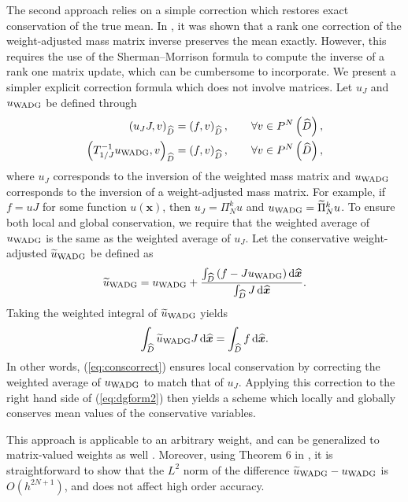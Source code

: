 \documentclass[preprint,10pt]{article}
\theoremstyle{definition}
\theoremstyle{lemma}
\theoremstyle{theorem}
\theoremstyle{assumption}
\renewcommand{\hat}{\widehat}
\renewcommand{\tilde}{\widetilde}
\newcommand{\LRp}[1]{\left( #1 \right)}
\newcommand*\diff[1]{\mathop{}\!{\mathrm{d}#1}} %
\begin{document}
{The second approach relies on a simple correction which restores exact conservation of the true mean.  In \cite{chan2016weight2}, it was shown that a rank one correction of the weight-adjusted mass matrix inverse preserves the mean exactly.  However, this requires the use of the Sherman--Morrison formula to compute the inverse of a rank one matrix update, which can be cumbersome to incorporate.  We present a simpler explicit correction formula which does not involve matrices.  Let $u_J$ and $u_{\rm WADG}$ be defined through 
\begin{align*}
\LRp{u_J J,v}_{\hat{D}} &= \LRp{f,v}_{\hat{D}}, \qquad \forall v \in P^N\LRp{\hat{D}},\\
\LRp{T_{1/J}^{-1}u_{\rm WADG},v}_{\hat{D}} &= \LRp{f,v}_{\hat{D}}, \qquad \forall v \in P^N\LRp{\hat{D}},
\end{align*}
where $u_J$ corresponds to the inversion of the weighted mass matrix and $u_{\rm WADG}$ corresponds to the inversion of a weight-adjusted mass matrix.  For example, if $f = u J$ for some function $u(\bm{x})$, then $u_J = \Pi^k_N u$ and $u_{\rm WADG} = \tilde{\Pi}^k_N u$.  To ensure both local and global conservation, we require that the weighted average of $u_{\rm WADG}$ is the same as the weighted average of $u_J$.  Let the conservative weight-adjusted $\tilde{u}_{\rm WADG}$ be defined as
\begin{equation}
  \tilde{u}_{\rm WADG} = u_{\rm WADG} + \frac{\int_{\hat{D}} \left(f  - J u_{\rm WADG}\right)\diff{\hat{\bm{x}}}}{\int_{\hat{D}} J \diff{\hat{\bm{x}}}}.  
  \label{eq:conscorrect}
\end{equation}
Taking the weighted integral of $\tilde{u}_{\rm WADG}$ yields
\[
  \int_{\hat{D}}\tilde{u}_{\rm WADG}J \diff{\hat{\bm{x}}} = \int_{\hat{D}} f \diff{\hat{\bm{x}}}.
\]
In other words, (\ref{eq:conscorrect}) ensures local conservation by correcting the weighted average of $u_{\rm WADG}$ to match that of $u_J$.  Applying this correction to the right hand side of (\ref{eq:dgform2}) then yields a scheme which locally and globally conserves mean values of the conservative variables.

This approach is applicable to an arbitrary weight, and can be generalized to matrix-valued weights as well \cite{chan2017weight}.  Moreover, using Theorem 6 in \cite{chan2016weight1}, it is straightforward to show that the $L^2$ norm of the difference $\tilde{u}_{\rm WADG} - u_{\rm WADG}$ is $O(h^{2N+1})$, and does not affect high order accuracy.  

}
\end{document}
